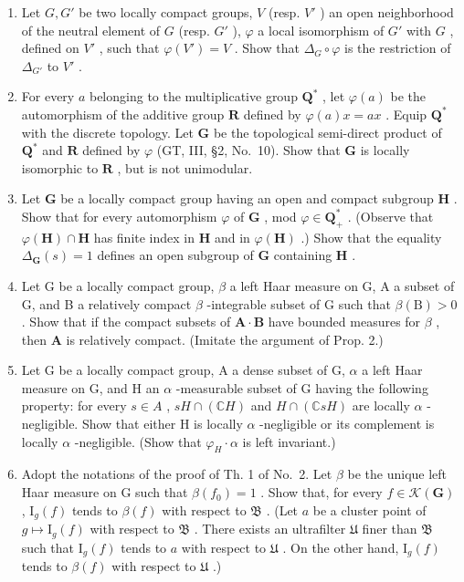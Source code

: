 \begin{enumerate}
\def\labelenumi{\arabic{enumi})}
\setcounter{enumi}{3}
\item
  Let \(G, G'\) be two locally compact groups, \(V\) (resp. \(V'\) ) an open neighborhood of the neutral element of \(G\) (resp. \(G'\) ), \(\varphi\) a local isomorphism of \(G'\) with \(G\) , defined on \(V'\) , such that \(\varphi(V') = V\) . Show that \(\Delta_G \circ \varphi\) is the restriction of \(\Delta_{G'}\) to \(V'\) .
\item
  For every \(a\) belonging to the multiplicative group \(\mathbf{Q}^*\) , let \(\varphi(a)\) be the automorphism of the additive group \(\mathbf{R}\) defined by \(\varphi(a)x = ax\) . Equip \(\mathbf{Q}^*\) with the discrete topology. Let \(\mathbf{G}\) be the topological semi-direct product of \(\mathbf{Q}^*\) and \(\mathbf{R}\) defined by \(\varphi\) (GT, III, §2, No.~10). Show that \(\mathbf{G}\) is locally isomorphic to \(\mathbf{R}\) , but is not unimodular.
\item
  Let \(\mathbf{G}\) be a locally compact group having an open and compact subgroup \(\mathbf{H}\) . Show that for every automorphism \(\varphi\) of \(\mathbf{G}\) , mod \(\varphi \in \mathbf{Q}_+^*\) . (Observe that \(\varphi(\mathbf{H}) \cap \mathbf{H}\) has finite index in \(\mathbf{H}\) and in \(\varphi(\mathbf{H})\) .) Show that the equality \(\Delta_{\mathbf{G}}(s) = 1\) defines an open subgroup of \(\mathbf{G}\) containing \(\mathbf{H}\) .
\item
  Let G be a locally compact group, \(\beta\) a left Haar measure on G, A a subset of G, and B a relatively compact \(\beta\) -integrable subset of G such that \(\beta(\mathrm{B}) > 0\) . Show that if the compact subsets of \(\mathbf{A} \cdot \mathbf{B}\) have bounded measures for \(\beta\) , then \(\mathbf{A}\) is relatively compact. (Imitate the argument of Prop. 2.)
\item
  Let G be a locally compact group, A a dense subset of G, \(\alpha\) a left Haar measure on G, and H an \(\alpha\) -measurable subset of G having the following property: for every \(s \in A\) , \(sH \cap (\mathbb{C}H)\) and \(H \cap (\mathbb{C}sH)\) are locally \(\alpha\) -negligible. Show that either H is locally \(\alpha\) -negligible or its complement is locally \(\alpha\) -negligible. (Show that \(\varphi_{H} \cdot \alpha\) is left invariant.)
\item
  Adopt the notations of the proof of Th. 1 of No.~2. Let \(\beta\) be the unique left Haar measure on G such that \(\beta(f_0) = 1\) . Show that, for every \(f \in \mathcal{K}(\mathbf{G})\) , \(\mathrm{I}_g(f)\) tends to \(\beta(f)\) with respect to \(\mathfrak{B}\) . (Let \(a\) be a cluster point of \(g \mapsto \mathrm{I}_g(f)\) with respect to \(\mathfrak{B}\) . There exists an ultrafilter \(\mathfrak{U}\) finer than \(\mathfrak{B}\) such that \(\mathrm{I}_g(f)\) tends to \(a\) with respect to \(\mathfrak{U}\) . On the other hand, \(\mathrm{I}_g(f)\) tends to \(\beta(f)\) with respect to \(\mathfrak{U}\) .)

\end{enumerate}
